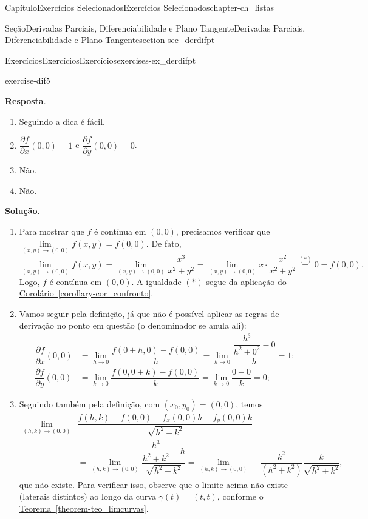 \documentclass[oneside,10pt,]{book}
\newcommand{\blocktitlefont}{\relax}
\newcommand{\xreffont}{\relax}
\numberwithin{equation}{section}
\begin{document}
\begin{chapterptx}{Capítulo}{Exercícios Selecionados}{}{Exercícios Selecionados}{}{}{chapter-ch_listas}
\begin{sectionptx}{Seção}{Derivadas Parciais, Diferenciabilidade e Plano Tangente}{}{Derivadas Parciais, Diferenciabilidade e Plano Tangente}{}{}{section-sec_derdifpt}
\begin{exercises-subsection-numberless}{Exercícios}{Exercícios}{}{Exercícios}{}{}{exercises-ex_derdifpt}
\begin{divisionexercise}{5}{}{}{exercise-dif5}
\par\smallskip%
\noindent\textbf{\blocktitlefont Resposta}.\hypertarget{answer-dif5-c}{}\quad{}%
\begin{enumerate}[label=\alph*]
\item{}Seguindo a dica é fácil.%
\item{}\(\dfrac{\partial f}{\partial x}(0,0)=1\) e \(\dfrac{\partial f}{\partial y}(0,0)=0\).%
\item{}Não.%
\item{}Não.%
\end{enumerate}
%
\par\smallskip%
\noindent\textbf{\blocktitlefont Solução}.\hypertarget{solution-dif5-d}{}\quad{}%
\begin{enumerate}[label=\alph*]
\item{}Para mostrar que \(f\) é contínua em \((0,0)\), precisamos verificar que \(\lim\limits_{(x,y)\to (0,0)}
f(x,y)=f(0,0)\). De fato,%
\begin{equation*}
\lim\limits_{(x,y)\to (0,0)} f(x,y)=
\lim\limits_{(x,y)\to (0,0)}\dfrac{x^3}{x^2+y^2}=
\lim\limits_{(x,y)\to
(0,0)}x\cdot\dfrac{x^2}{x^2+y^2}\stackrel{(\ast)}{=}0=f(0,0).
\end{equation*}
Logo, \(f\) é contínua em \((0,0)\). A igualdade \((\ast)\) segue da aplicação do \hyperref[corollary-cor_confronto]{Corolário~{\xreffont\ref{corollary-cor_confronto}}}.%
\item{}Vamos seguir pela definição, já que não é possível aplicar as regras de derivação no ponto em questão (o denominador se anula ali):%
\begin{align*}
\dfrac{\partial f}{\partial
x}(0,0)&=\lim\limits_{h\to
0}\dfrac{f(0+h,0)-f(0,0)}{h}
=\lim\limits_{h\to
0}\dfrac{\dfrac{h^3}{h^2+0^2}-0}{h}=1;\\
\dfrac{\partial f}{\partial
y}(0,0)&=\lim\limits_{k\to
0}\dfrac{f(0,0+k)-f(0,0)}{k}
=\lim\limits_{k\to
0}\dfrac{0-0}{k}=0;
\end{align*}
%
\item{}Seguindo também pela definição, com \((x_0,y_0)=(0,0)\), temos%
\begin{align*}
\lim\limits_{(h,k)\to(0,0)}
&\dfrac{f(h,k)-f(0,0)-f_x(0,0)h-f_y(0,0)k}
{\sqrt{h^2+k^2}}\\
& =\lim\limits_{(h,k)\to(0,0)}
\dfrac{\dfrac{h^3}{h^2+k^2}-h}{\sqrt{h^2+k^2}}=
\lim\limits_{(h,k)\to(0,0)}
-\dfrac{k^2}{(h^2+k^2)}\dfrac{k}{\sqrt{h^2+k^2}},
\end{align*}
que não existe. Para verificar isso, observe que o limite acima não existe (laterais distintos) ao longo da curva \(\gamma(t)=(t,t)\), conforme o \hyperref[theorem-teo_limcurvas]{Teorema~{\xreffont\ref{theorem-teo_limcurvas}}}.%

\end{enumerate}
\end{divisionexercise}
\end{exercises-subsection-numberless}
\end{sectionptx}
\end{chapterptx}
\end{document}
